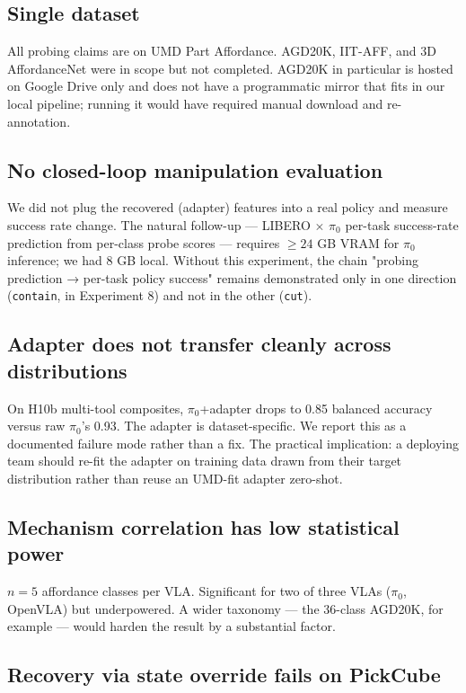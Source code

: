 \documentclass[11pt]{article}
\begin{document}
\subsection{Single dataset}

All probing claims are on UMD Part Affordance. AGD20K, IIT-AFF, and
3D AffordanceNet were in scope but not completed. AGD20K in particular
is hosted on Google Drive only and does not have a programmatic mirror
that fits in our local pipeline; running it would have required manual
download and re-annotation.

\subsection{No closed-loop manipulation evaluation}

We did not plug the recovered (adapter) features into a real policy
and measure success rate change. The natural follow-up --- LIBERO
\cite{liu2023libero} $\times$ $\pi_0$ per-task success-rate prediction
from per-class probe scores --- requires $\geq 24$ GB VRAM for $\pi_0$
inference; we had 8 GB local. Without this experiment, the chain
"probing prediction → per-task policy success" remains demonstrated
only in one direction (\texttt{contain}, in Experiment 8) and not in
the other (\texttt{cut}).

\subsection{Adapter does not transfer cleanly across distributions}

On H10b multi-tool composites, $\pi_0$+adapter drops to 0.85 balanced
accuracy versus raw $\pi_0$'s 0.93. The adapter is dataset-specific.
We report this as a documented failure mode rather than a fix. The
practical implication: a deploying team should re-fit the adapter on
training data drawn from their target distribution rather than reuse
an UMD-fit adapter zero-shot.

\subsection{Mechanism correlation has low statistical power}

$n = 5$ affordance classes per VLA. Significant for two of three VLAs
($\pi_0$, OpenVLA) but underpowered. A wider taxonomy --- the
36-class AGD20K, for example --- would harden the result by a
substantial factor.

\subsection{Recovery via state override fails on PickCube}
\end{document}
